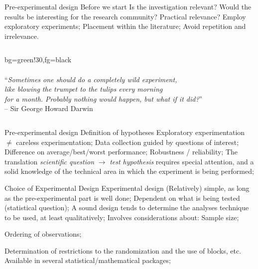 \documentclass[t]{beamer}
\begin{document}
\begin{ftst}
{Pre-experimental design}
{Before we start}
\bitems Is the investigation relevant?
	\spitem Would the results be interesting for the research community?
	\spitem Practical relevance?
	\bitems Employ exploratory experiments;\eitem
	\spitem Placement within the literature;
	\bitems Avoid repetition and irrelevance.\eitem
\eitem
\begin{columns}[T]
\begin{colorblock}{}{bg=green!30,fg=black}
{\ \\\ \\\scriptsize``\textit{Sometimes one should do a completely wild experiment,\\like blowing the trumpet to the tulips every morning\\for a month. Probably nothing would happen, but what if it did?}''\\}
{\tiny -- Sir George Howard Darwin}
\end{colorblock}
\end{columns}
\end{ftst}


\begin{ftst}
{Pre-experimental design}
{Definition of hypotheses}
\bitems Exploratory experimentation $\neq$ careless experimentation;
	\spitem Data collection guided by questions of interest;
	\bitems Difference on average/best/worst performance;
		\spitem Robustness / reliability;
	\eitem
	\spitem The translation \textit{scientific question} $\rightarrow$ \textit{test hypothesis} requires special attention, and a solid knowledge of the technical area in which the experiment is being performed;
\eitem
\end{ftst}


\begin{ftst}
{Choice of Experimental Design}
{Experimental design}
\bitems (Relatively) simple, as long as the pre-experimental part is well done;
	\spitem Dependent on what is being tested (statistical question);
	\spitem A sound design tends to determine the analyses technique to be used, at least  qualitatively;
	\spitem Involves considerations about:
	\bitems Sample size;
		\item Ordering of observations;
		\item Determination of restrictions to the randomization and the use of blocks, etc.
	\eitem
	\spitem Available in several statistical/mathematical packages;
\eitem
\end{ftst}
\end{document}
